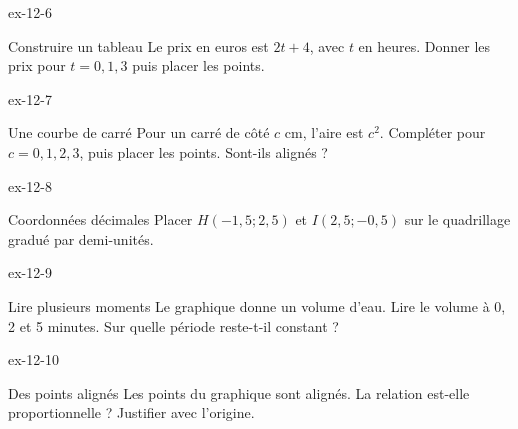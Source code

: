 \begin{blocLivre}{ex-12-6}\begin{exercice}[2]{Construire un tableau}
Le prix en euros est $2t+4$, avec $t$ en heures. Donner les prix pour $t=0,1,3$ puis placer les points.
\label{fig-ex-12-6}
\end{exercice}\end{blocLivre}
\begin{blocLivre}{ex-12-7}\begin{exercice}[2]{Une courbe de carré}
Pour un carré de côté $c$ cm, l’aire est $c^2$. Compléter pour $c=0,1,2,3$, puis placer les points. Sont-ils alignés ?
\label{fig-ex-12-7}
\end{exercice}\end{blocLivre}
\begin{blocLivre}{ex-12-8}\begin{exercice}[2]{Coordonnées décimales}
Placer $H(-1{,}5;2{,}5)$ et $I(2{,}5;-0{,}5)$ sur le quadrillage gradué par demi-unités.
\label{fig-ex-12-8}
\end{exercice}\end{blocLivre}
\begin{blocLivre}{ex-12-9}\begin{exercice}[2]{Lire plusieurs moments}
Le graphique donne un volume d’eau. Lire le volume à 0, 2 et 5 minutes. Sur quelle période reste-t-il constant ?
\label{fig-ex-12-9}
\end{exercice}\end{blocLivre}
\begin{blocLivre}{ex-12-10}\begin{exercice}[2]{Des points alignés}
Les points du graphique sont alignés. La relation est-elle proportionnelle ? Justifier avec l’origine.
\label{fig-ex-12-10}
\end{exercice}\end{blocLivre}

